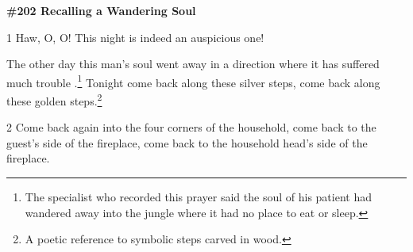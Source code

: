 
\textbf{\#202 Recalling a Wandering Soul}

1 Haw, O, O!  This night is indeed an auspicious one!

The other day this man's soul went away in a direction where it has suffered much
trouble .\footnote{The specialist who recorded this prayer said the soul of his patient had wandered away into the jungle where it had no place to eat or sleep.}  Tonight come back along these silver steps, come back along these
golden steps.\footnote{A poetic reference to symbolic steps carved in wood.}

2 Come back again into the four corners of the household, come back to the guest's
side of the fireplace, come back to the household head's side of the fireplace.
